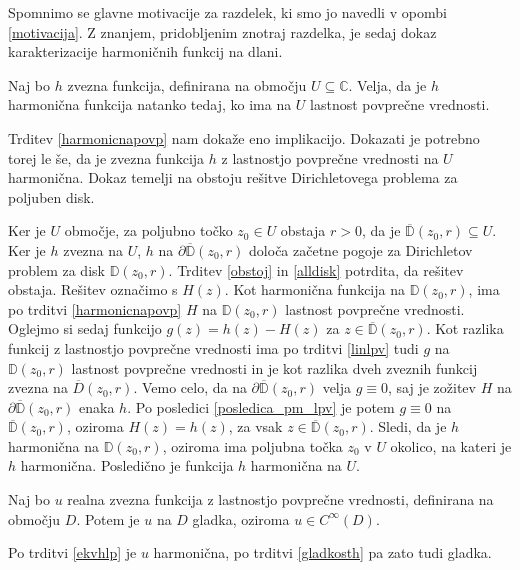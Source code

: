 \documentclass[mat1]{fmfdelo}
\newcommand{\C}{\mathbb C}
\begin{document}
    Spomnimo se glavne motivacije za razdelek, ki smo jo navedli v opombi \ref{motivacija}.
    Z znanjem, pridobljenim znotraj razdelka, je sedaj dokaz karakterizacije harmoničnih funkcij na dlani.
    
    \begin{trditev}
        \label{ekvhlp}
        Naj bo $h$ zvezna funkcija, definirana na območju $U \subseteq \C$. Velja, da je $h$ harmonična funkcija natanko tedaj, ko ima na $U$ lastnost povprečne vrednosti.
    \end{trditev}
    \begin{dokaz}
        Trditev \ref{harmonicnapovp} nam dokaže eno implikacijo. Dokazati je potrebno torej le še, da je zvezna funkcija $h$ z lastnostjo povprečne vrednosti na $U$ harmonična. 
        Dokaz temelji na obstoju rešitve Dirichletovega problema za poljuben disk. 
        
        Ker je $U$ območje, za poljubno točko $z_0 \in U$ obstaja $r>0$, da je $\overline{\mathbb{D}}(z_0,r) \subseteq U$. Ker je $h$ zvezna na $U$, $h$ na $\partial \overline{\mathbb{D}}(z_0, r)$ določa začetne pogoje za Dirichletov problem za disk $\mathbb{D}(z_0,r)$.
        Trditev \ref{obstoj} in \ref{alldisk} potrdita, da rešitev obstaja. Rešitev označimo s $H(z)$.
        Kot harmonična funkcija na $\mathbb{D}(z_0, r)$, ima po trditvi \ref{harmonicnapovp} $H$ na $\mathbb{D}(z_0, r)$ lastnost povprečne vrednosti. 
        Oglejmo si sedaj funkcijo $g(z) = h(z) - H(z)$ za $z \in \overline{\mathbb{D}}(z_0,r)$. 
        Kot razlika funkcij z lastnostjo povprečne vrednosti ima po trditvi \ref{linlpv} tudi $g$ na $\mathbb{D}(z_0, r)$ lastnost povprečne vrednosti in je kot razlika dveh zveznih funkcij zvezna na $\overline{D}(z_0, r)$.
        Vemo celo, da na $\partial \overline{\mathbb{D}}(z_0, r)$ velja $g \equiv 0$, saj je zožitev $H$ na $\partial \overline{\mathbb{D}}(z_0,r)$ enaka $h$. 
        Po posledici \ref{posledica_pm_lpv} je potem $g \equiv 0$ na $\overline{\mathbb{D}}(z_0, r)$, oziroma $H(z) =  h(z)$, za vsak $z \in \overline{\mathbb{D}}(z_0, r)$. Sledi, da je $h$ harmonična na $\mathbb{D}(z_0, r)$, oziroma ima poljubna točka $z_0$ v $U$ okolico, na kateri je $h$ harmonična. 
        Posledično je funkcija $h$ harmonična na $U$.
    \end{dokaz}
    \begin{posledica}
        Naj bo $u$ realna zvezna funkcija z lastnostjo povprečne vrednosti, definirana na območju $D$. Potem je $u$ na $D$ gladka, oziroma $u \in C^{\infty}(D)$.
    \end{posledica}
    \begin{dokaz}
        Po trditvi \ref{ekvhlp} je $u$ harmonična, po trditvi \ref{gladkosth} pa zato tudi gladka.
    \end{dokaz}
\end{document}
